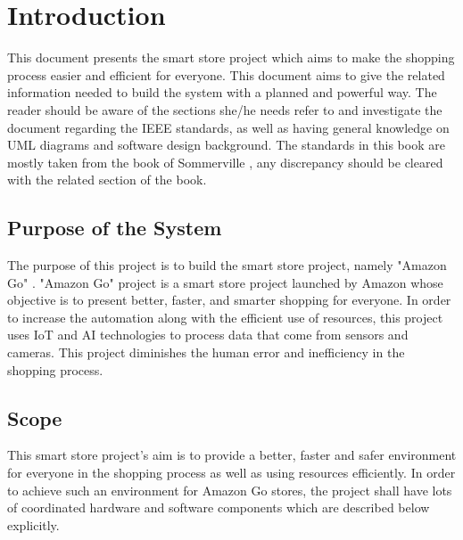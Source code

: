 \chapter{Introduction}
\label{ch:intro}

This document presents the smart store project which aims to make the shopping process easier and efficient for everyone. This document aims to give the related information needed to build the system with a planned and powerful way. The reader should be aware of the sections she/he needs refer to and investigate the document regarding the IEEE standards\cite{cite:ieee_2011_standards}, as well as having general knowledge on UML diagrams \cite{cite:booch_2004}\cite{cite:booch_2005}\cite{cite:siau_2007} and software design background. The standards in this book are mostly taken from the book of Sommerville \cite{cite:software_engineering_10}, any discrepancy should be cleared with the related section of the book.


\section{Purpose of the System}
The purpose of this project is to build the smart store project, namely "Amazon Go" \cite{cite:amazon_go_official}. "Amazon Go" project is a smart store project launched by Amazon whose objective is to present better, faster, and smarter shopping for everyone. In order to increase the automation along with the efficient use of resources, this project uses IoT and AI technologies to process data that come from sensors and cameras. This project diminishes the human error and inefficiency in the shopping process.

\section{Scope}


This smart store project's aim is to provide a better, faster and safer environment for everyone in the shopping process as well as using resources efficiently. In order to
achieve such an environment for Amazon Go stores, the project shall have lots of
coordinated hardware and software components which are described below explicitly.

